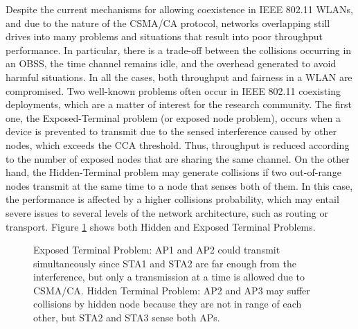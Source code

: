 \documentclass[12pt, a4paper,twoside]{tesi_upf}
\begin{document}
			Despite the current mechanisms for allowing coexistence in IEEE 802.11 WLANs, and due to the nature of the CSMA/CA protocol, networks overlapping still drives into many problems and situations that result into poor throughput performance. In particular, there is a trade-off between the collisions occurring in an OBSS, the time channel remains idle, and the overhead generated to avoid harmful situations. In all the cases, both throughput and fairness in a WLAN are compromised. Two well-known problems often occur in IEEE 802.11 coexisting deployments, which are a matter of interest for the research community. The first one, the Exposed-Terminal problem (or exposed node problem), occurs when a device is prevented to transmit due to the sensed interference caused by other nodes, which exceeds the CCA threshold. Thus, throughput is reduced according to the number of exposed nodes that are sharing the same channel. On the other hand, the Hidden-Terminal problem may generate collisions if two out-of-range nodes transmit at the same time to a node that senses both of them. In this case, the performance is affected by a higher collisions probability, which may entail severe issues to several levels of the network architecture, such as routing or transport. Figure \ref{fig:hidden_exposed} shows both Hidden and Exposed Terminal Problems.					
			\begin{figure}[h!]
				\centering
				\caption{Exposed Terminal Problem: AP1 and AP2 could transmit simultaneously since STA1 and STA2 are far enough from the interference, but only a transmission at a time is allowed due to CSMA/CA. Hidden Terminal Problem: AP2 and AP3 may suffer collisions by hidden node because they are not in range of each other, but STA2 and STA3 sense both APs.}
				\label{fig:hidden_exposed}
			\end{figure}		
			
\end{document}
